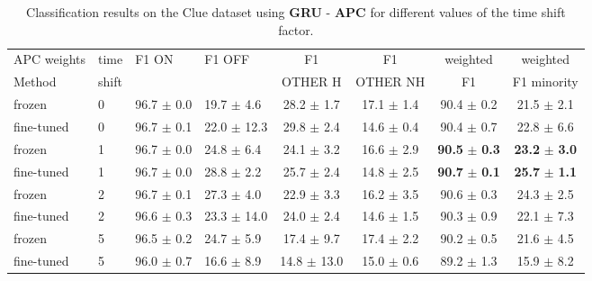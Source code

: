 \documentclass{article}
\begin{document}
\begin{table}[h]
\caption{
Classification results on the Clue dataset using \textbf{GRU} - \textbf{APC} for different values of the time shift factor.}
\label{tab:results_clue_APC_GRU}
\vskip 0.1in
\begin{center}
\begin{small}
\begin{sc}
\begin{tabular}{llllcccc}
\toprule
{APC weights} & {time} &  {F1 ON} & {F1 OFF} & {F1} & {F1} & {weighted} & {weighted}\\
{Method} & {shift} &  &  & {OTHER H} & {OTHER NH} & {F1} & {F1 minority}\\
\midrule
{frozen} & 0 & 96.7 $\pm$ 0.0 & 19.7 $\pm$  4.6 &  28.2 $\pm$ 1.7 & 17.1 $\pm$ 1.4 & 90.4 $\pm$ 0.2 & 21.5 $\pm$ 2.1 \\
\hline
{fine-tuned} &  0 & 96.7 $\pm$ 0.1 & 22.0 $\pm$ 12.3 & 29.8 $\pm$ 2.4 & 14.6 $\pm$ 0.4 & 90.4 $\pm$ 0.7 & 22.8 $\pm$ 6.6 \\
\hline
{frozen} & 1 & 96.7 $\pm$ 0.0 & 24.8 $\pm$ 6.4 &  24.1 $\pm$ 3.2 & 16.6 $\pm$ 2.9 & \textbf{90.5} $\pm$ \textbf{0.3} & \textbf{23.2} $\pm$ \textbf{3.0}\\
\hline
{fine-tuned} &  1 & 96.7 $\pm$ 0.0 & 28.8 $\pm$ 2.2 & 25.7 $\pm$ 2.4 & 14.8 $\pm$ 2.5 & \textbf{90.7} $\pm$ \textbf{0.1} & \textbf{25.7} $\pm$ \textbf{1.1} \\
\hline
{frozen} &  2 & 96.7 $\pm$ 0.1 & 27.3 $\pm$ 4.0 &  22.9 $\pm$ 3.3 & 16.2 $\pm$ 3.5 & 90.6 $\pm$ 0.3 & 24.3 $\pm$ 2.5 \\
\hline
{fine-tuned} &  2 & 96.6 $\pm$ 0.3 & 23.3 $\pm$ 14.0 &  24.0 $\pm$ 2.4 & 14.6 $\pm$ 1.5 & 90.3 $\pm$ 0.9 & 22.1 $\pm$ 7.3\\
\hline
{frozen} &  5 & 96.5 $\pm$ 0.2 & 24.7 $\pm$ 5.9 & 17.4 $\pm$ 9.7 & 17.4 $\pm$ 2.2 & 90.2 $\pm$ 0.5 & 21.6 $\pm$ 4.5 \\
\hline
{fine-tuned} &  5 & 96.0 $\pm$ 0.7 & 16.6 $\pm$ 8.9 & 14.8 $\pm$ 13.0 & 15.0 $\pm$ 0.6 & 89.2 $\pm$ 1.3 & 15.9 $\pm$ 8.2\\
\bottomrule
\end{tabular}
\end{sc}
\end{small}
\end{center}
\vskip -0.15in
\end{table}
\end{document}
